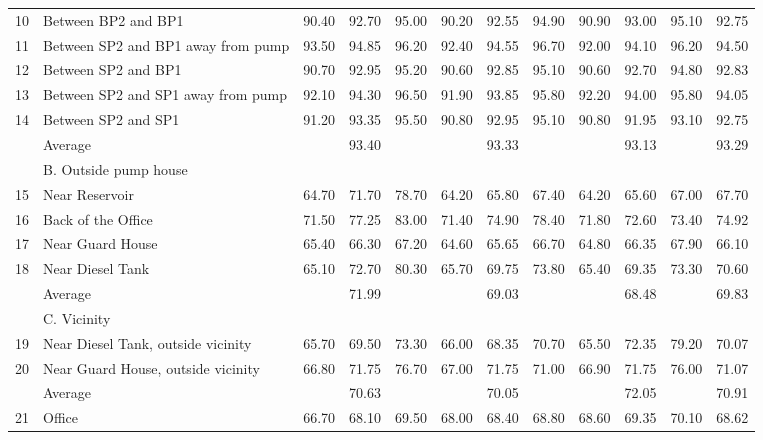 \begin{table}[!h]
{{\begin{tabular}{c|p{4cm}|ccc|ccc|ccc|c}
	10 & Between BP2 and BP1 & 90.40 & 92.70 & 95.00 & 90.20 & 92.55 & 94.90 & 90.90 & 93.00 & 95.10 & 92.75 \\ 
	11 & Between SP2 and BP1 away from pump & 93.50 & 94.85 & 96.20 & 92.40 & 94.55 & 96.70 & 92.00 & 94.10 & 96.20 & 94.50 \\ 
	12 & Between SP2 and BP1 & 90.70 & 92.95 & 95.20 & 90.60 & 92.85 & 95.10 & 90.60 & 92.70 & 94.80 & 92.83 \\ 
	13 & Between SP2 and SP1 away from pump & 92.10 & 94.30 & 96.50 & 91.90 & 93.85 & 95.80 & 92.20 & 94.00 & 95.80 & 94.05 \\ 
	14 & Between SP2 and SP1 & 91.20 & 93.35 & 95.50 & 90.80 & 92.95 & 95.10 & 90.80 & 91.95 & 93.10 & 92.75 \\ 
	& Average &  & 93.40 &  &  & 93.33 &  &  & 93.13 &  & 93.29 \\ 
	\hline
	& B. Outside pump house &  &  &  &  &  &  &  &  &  &  \\ 
	15 & Near Reservoir & 64.70 & 71.70 & 78.70 & 64.20 & 65.80 & 67.40 & 64.20 & 65.60 & 67.00 & 67.70 \\ 
	16 & Back of the Office & 71.50 & 77.25 & 83.00 & 71.40 & 74.90 & 78.40 & 71.80 & 72.60 & 73.40 & 74.92 \\ 
	17 & Near Guard House & 65.40 & 66.30 & 67.20 & 64.60 & 65.65 & 66.70 & 64.80 & 66.35 & 67.90 & 66.10 \\ 
	18 & Near Diesel Tank & 65.10 & 72.70 & 80.30 & 65.70 & 69.75 & 73.80 & 65.40 & 69.35 & 73.30 & 70.60 \\ 
	& Average &  & 71.99 &  &  & 69.03 &  &  & 68.48 &  & 69.83 \\ 
	\hline
	& C. Vicinity &  &  &  &  &  &  &  &  &  &  \\ 
	19 & Near Diesel Tank, outside vicinity & 65.70 & 69.50 & 73.30 & 66.00 & 68.35 & 70.70 & 65.50 & 72.35 & 79.20 & 70.07 \\ 
	20 & Near Guard House, outside vicinity & 66.80 & 71.75 & 76.70 & 67.00 & 71.75 & 71.00 & 66.90 & 71.75 & 76.00 & 71.07 \\ 
	& Average &  & 70.63 &  &  & 70.05 &  &  & 72.05 &  & 70.91 \\ 
	\hline
	21 & Office & 66.70 & 68.10 & 69.50 & 68.00 & 68.40 & 68.80 & 68.60 & 69.35 & 70.10 & 68.62 \\ 
	\hline
\end{tabular}
	}}
\end{table}




